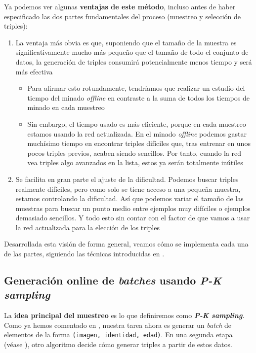 Ya podemos ver algunas \textbf{ventajas de este método}, incluso antes de haber especificado las dos partes fundamentales del proceso (muestreo y selección de triples):

\begin{enumerate}
    \item La ventaja más obvia es que, suponiendo que el tamaño de la muestra es significativamente mucho más pequeño que el tamaño de todo el conjunto de datos, la generación de triples consumirá potencialmente menos tiempo y será más efectiva
        \begin{itemize}
            \item Para afirmar esto rotundamente, tendríamos que realizar un estudio del tiempo del minado \textit{offline} en contraste a la suma de todos los tiempos de minado en cada muestreo
            \item Sin embargo, el tiempo usado es más eficiente, porque en cada muestreo estamos usando la red actualizada. En el minado \textit{offline} podemos gastar muchísimo tiempo en encontrar triples difíciles que, tras entrenar en unos pocos triples previos, acaben siendo sencillos. Por tanto, cuando la red vea triples algo avanzados en la lista, estos ya serán totalmente inútiles
        \end{itemize}
    \item Se facilita en gran parte el ajuste de la dificultad. Podemos buscar triples realmente difíciles, pero como solo se tiene acceso a una pequeña muestra, estamos controlando la dificultad. Así que podemos variar el tamaño de las muestras para buscar un punto medio entre ejemplos muy difíciles o ejemplos demasiado sencillos. Y todo esto sin contar con el factor de que vamos a usar la red actualizada para la elección de los triples
\end{enumerate}

Desarrollada esta visión de forma general, veamos cómo se implementa cada una de las partes, siguiendo las técnicas introducidas en \cite{informatica:principal}.

\subsection{Generación online de \textit{batches} usando \textit{P-K sampling}} \label{isubs:muestreo_datos_pk_sampling_teoria}

La \textbf{idea principal del muestreo} es lo que definiremos como \textbf{\textit{P-K sampling}}. Como ya hemos comentado en , nuestra tarea ahora es generar un \textit{batch} de elementos de la forma \lstinline{(imagen, identidad, edad)}. En una segunda etapa (véase ), otro algoritmo decide cómo generar triples a partir de estos datos.

